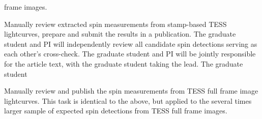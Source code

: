 \documentclass[12pt,letter]{article}
\begin{document}
\begin{description}
        frame images.
%
    \item[by month 21:] Manually review extracted spin measurements from
        stamp-based TESS lightcurves, prepare and submit the results in a
        publication. The graduate student and PI will independently review all
        candidate spin detections serving as each other's cross-check. The
        graduate student and PI will be jointly responsible for the article
        text, with the graduate student taking the lead. The graduate student
%
    \item[by month 24:] Manually review and publish the spin measurements from
        TESS full frame image lightcurves. This task is identical to the above,
        but applied to the several times larger sample of expected spin
        detections from TESS full frame images.
%
\end{description}

\section*{}




\end{document}
